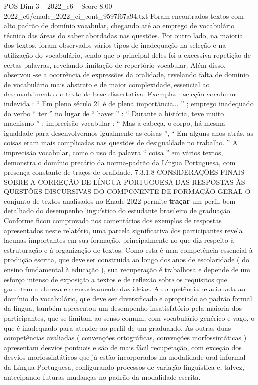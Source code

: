\begin{textsample}{POS Dim 3 – 2022\_c6 – Score 8.00 – 2022\_c6/enade\_2022\_ci\_cont\_9597f67a94.txt}
Foram encontrados textos com alto padrão de domínio vocabular, chegando até ao emprego de vocabulário técnico das áreas do saber abordadas nas questões.
Por outro lado, na maioria dos textos, foram observados vários tipos de inadequação na seleção e na utilização do vocabulário, sendo que o principal deles foi a excessiva repetição de certas palavras, revelando limitação de repertório vocabular.
Além disso, observou -se a ocorrência de expressões da oralidade, revelando falta de domínio de vocabulário mais abstrato e de maior complexidade, essencial ao desenvolvimento do texto de base dissertativa.
Exemplos : seleção vocabular indevida : “ Em pleno século 21 é de plena importância... ” ; emprego inadequado do verbo “ ter ” no lugar de “ haver ” : “ Durante a história, teve muito machismo ” ; imprecisão vocabular : “ Mas a cabeça, o corpo, há mesma igualdade para desenvolvermos igualmente as coisas ”, “ Em alguns anos atrás, as coisas eram mais complicadas nas questões de desigualdade no trabalho. ” A imprecisão vocabular, como o uso da palavra “ coisa ” em vários textos, demonstra o domínio precário da norma-padrão da Língua Portuguesa, com presença constante de traços de oralidade. 7.3.1.8 CONSIDERAÇÕES FINAIS SOBRE A CORREÇÃO DE LÍNGUA PORTUGUESA DAS RESPOSTAS ÀS QUESTÕES DISCURSIVAS DO COMPONENTE DE FORMAÇÃO GERAL O conjunto de textos analisados no Enade 2022 permite \textbf{traçar} um perfil bem detalhado do desempenho linguístico do estudante brasileiro de graduação.
Conforme ficou comprovado nos comentários dos exemplos de respostas apresentados neste relatório, uma parcela significativa dos participantes revela lacunas importantes em sua formação, principalmente no que diz respeito à estruturação e à organização de textos.
Como esta é uma competência essencial à produção escrita, que deve ser construída ao longo dos anos de escolaridade ( do ensino fundamental à educação ), sua recuperação é trabalhosa e depende de um esforço intenso de exposição a textos e de reflexão sobre os requisitos que garantem a clareza e o encadeamento das ideias.
A competência relacionada ao domínio do vocabulário, que deve ser diversificado e apropriado ao padrão formal da língua, também apresentou um desempenho insatisfatório pela maioria dos participantes, que se limitam ao senso comum, com vocabulário genérico e vago, o que é inadequado para atender ao perfil de um graduando.
As outras duas competências avaliadas ( convenções ortográficas, convenções morfossintáticas ) apresentam desvios pontuais e são de mais fácil recuperação, com exceção dos desvios morfossintáticos que já estão incorporados na modalidade oral informal da Língua Portuguesa, configurando processos de variação linguística e, talvez, antecipando futuras mudanças no padrão da modalidade escrita.

\end{textsample}
